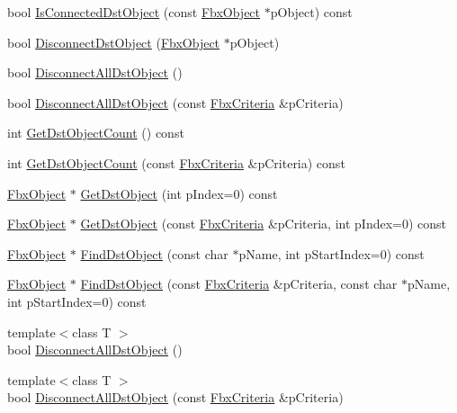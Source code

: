 \begin{Indent}
\begin{DoxyCompactItemize}
\item 
bool \hyperlink{class_fbx_object_a06725964170902b4d79453d76326fc5b}{Is\+Connected\+Dst\+Object} (const \hyperlink{class_fbx_object}{Fbx\+Object} $\ast$p\+Object) const
\item 
bool \hyperlink{class_fbx_object_a949fdf817b27505861f293cea4dc3b86}{Disconnect\+Dst\+Object} (\hyperlink{class_fbx_object}{Fbx\+Object} $\ast$p\+Object)
\item 
bool \hyperlink{class_fbx_object_a5ebe517e8b3f221285b9754009c0660b}{Disconnect\+All\+Dst\+Object} ()
\item 
bool \hyperlink{class_fbx_object_a5668d54f53f16f5ffad95727f92a8ee6}{Disconnect\+All\+Dst\+Object} (const \hyperlink{class_fbx_criteria}{Fbx\+Criteria} \&p\+Criteria)
\item 
int \hyperlink{class_fbx_object_a5be091701bfa94643dc2333768f56866}{Get\+Dst\+Object\+Count} () const
\item 
int \hyperlink{class_fbx_object_a46183e2905f10779c57389dc4ec3a5de}{Get\+Dst\+Object\+Count} (const \hyperlink{class_fbx_criteria}{Fbx\+Criteria} \&p\+Criteria) const
\item 
\hyperlink{class_fbx_object}{Fbx\+Object} $\ast$ \hyperlink{class_fbx_object_a3dcc740f7d5d22a73bb726c469b41c31}{Get\+Dst\+Object} (int p\+Index=0) const
\item 
\hyperlink{class_fbx_object}{Fbx\+Object} $\ast$ \hyperlink{class_fbx_object_a353ab38d6dad42f974f9d1ab3372b4ce}{Get\+Dst\+Object} (const \hyperlink{class_fbx_criteria}{Fbx\+Criteria} \&p\+Criteria, int p\+Index=0) const
\item 
\hyperlink{class_fbx_object}{Fbx\+Object} $\ast$ \hyperlink{class_fbx_object_aebbe10e118482bb99048432fabd71194}{Find\+Dst\+Object} (const char $\ast$p\+Name, int p\+Start\+Index=0) const
\item 
\hyperlink{class_fbx_object}{Fbx\+Object} $\ast$ \hyperlink{class_fbx_object_a4f93119aca50aaa67a265763509e5eae}{Find\+Dst\+Object} (const \hyperlink{class_fbx_criteria}{Fbx\+Criteria} \&p\+Criteria, const char $\ast$p\+Name, int p\+Start\+Index=0) const
\item 
{\footnotesize template$<$class T $>$ }\\bool \hyperlink{class_fbx_object_aa3aab1135cdd8e63c3255e17f926d950}{Disconnect\+All\+Dst\+Object} ()
\item 
{\footnotesize template$<$class T $>$ }\\bool \hyperlink{class_fbx_object_afd459bbb653d2a31e5c03dfdb64e649b}{Disconnect\+All\+Dst\+Object} (const \hyperlink{class_fbx_criteria}{Fbx\+Criteria} \&p\+Criteria)

\end{DoxyCompactItemize}
\end{Indent}
